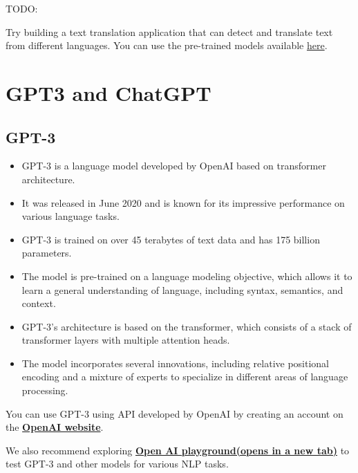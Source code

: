 TODO:

Try building a text translation application that can detect and
translate text from different languages. You can use the pre-trained
models available
\href{https://huggingface.co/models?pipeline_tag=translation&sort=downloads}{here}.

\section{GPT3 and ChatGPT}

\subsection{GPT-3}

\begin{itemize}
    \item GPT-3 is a language model developed by OpenAI based on transformer architecture.
    \item It was released in June 2020 and is known for its impressive performance on various language tasks.
    \item GPT-3 is trained on over 45 terabytes of text data and has 175 billion parameters.
    \item The model is pre-trained on a language modeling objective, which allows it to learn a general understanding of language, including syntax, semantics, and context.
    \item GPT-3's architecture is based on the transformer, which consists of a stack of transformer layers with multiple attention heads.
    \item The model incorporates several innovations, including relative positional encoding and a mixture of experts to specialize in different areas of language processing.
\end{itemize}
You can use GPT-3 using API developed by OpenAI by creating an account on the \href{https://platform.openai.com/overview}{\textbf{OpenAI website}}. \newline

We also recommend exploring \href{https://platform.openai.com/playground}{\textbf{Open AI playground(opens in a new tab)}} to test GPT-3 and other models for various NLP tasks.

